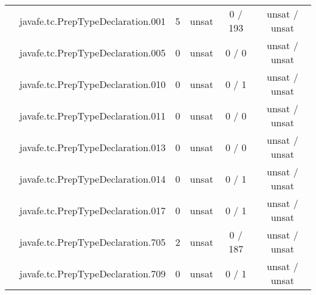 \begin{table}[htbp]
\begin{minipage}{0.60\textwidth}
{\begin{tabular}[c]{c c!{\vrule width 1.5pt}c|c!{\vrule width 1.5pt}c|c|}
		 	& javafe.tc.PrepTypeDeclaration.001	    		      & 5    & unsat   & 0  / 193  & unsat / unsat   \\
 			& javafe.tc.PrepTypeDeclaration.005	   		      & 0    & unsat   & 0  / 0    & unsat / unsat   \\
		 	& javafe.tc.PrepTypeDeclaration.010   			      & 0    & unsat   & 0  / 1    & unsat / unsat   \\
		 	& javafe.tc.PrepTypeDeclaration.011    			      & 0    & unsat   & 0  / 0    & unsat / unsat   \\
		 	& javafe.tc.PrepTypeDeclaration.013    			      & 0    & unsat   & 0  / 0    & unsat / unsat   \\
		 	& javafe.tc.PrepTypeDeclaration.014    			      & 0    & unsat   & 0  / 1    & unsat / unsat   \\
 			& javafe.tc.PrepTypeDeclaration.017	   		      & 0    & unsat   & 0  / 1    & unsat / unsat   \\
		 	& javafe.tc.PrepTypeDeclaration.705    			      & 2    & unsat   & 0  / 187  & unsat / unsat   \\
		 	& javafe.tc.PrepTypeDeclaration.709    			      & 0    & unsat   & 0  / 1    & unsat / unsat   \\

\end{tabular}}
\end{minipage}
\end{table}
